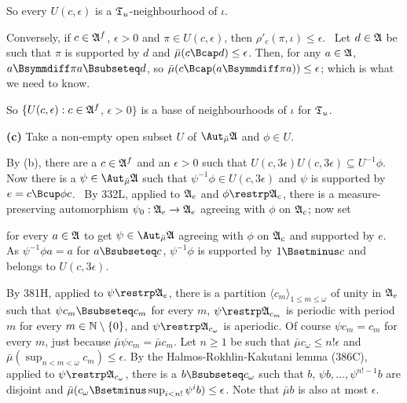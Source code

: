 {So every $U(c,\epsilon)$ is a $\frak T_u$-neighbourhood of $\iota$.

\medskip

 Conversely, if $c\in\frak A^f$, $\epsilon>0$ and
$\pi\in U(c,\epsilon)$, then $\rho'_c(\pi,\iota)\le\epsilon$.   \Prf\
Let $d\in\frak A$ be such that $\pi$ is supported by $d$ and
$\bar\mu(c\Bcap d)\le\epsilon$.   Then, for any $a\in\frak A$,
$a\Bsymmdiff\pi a\Bsubseteq d$, so
$\bar\mu(c\Bcap(a\Bsymmdiff\pi a))\le\epsilon$;  which is what we need to
know.\ \Qed

So $\{U(c,\epsilon):c\in\frak A^f$, $\epsilon>0\}$ is a base of
neighbourhoods of $\iota$ for $\frak T_u$.

\medskip

{\bf (c)} Take a non-empty open subset $U$ of $\AmuA$ and
$\phi\in U$.

\medskip

 By (b), there are a $c\in\frak A^f$ and an $\epsilon>0$
such that $U(c,3\epsilon)U(c,3\epsilon)\subseteq U^{-1}\phi$.   Now there
is a $\psi\in\AmuA$ such that $\psi^{-1}\phi\in U(c,3\epsilon)$
and $\psi$ is supported by $e=c\Bcup\phi c$.
\Prf\ By 332L, applied to $\frak A_e$ and $\phi\restrp\frak A_c$,
there is a measure-preserving automorphism $\psi_0:\frak A_e\to\frak A_e$
agreeing with $\phi$ on $\frak A_c$;  now set


\noindent for every $a\in\frak A$ to get $\psi\in\AmuA$ agreeing with
$\phi$ on $\frak A_c$ and supported by $e$.   As
$\psi^{-1}\phi a=a$ for $a\Bsubseteq c$, $\psi^{-1}\phi$ is supported by
$1\Bsetminus c$ and belongs to $U(c,3\epsilon)$.\ \Qed

\medskip

 By 381H, applied to $\psi\restrp\frak A_e$,
there is a partition
$\langle c_m\rangle_{1\le m\le\omega}$ of unity in $\frak A_e$ such that
$\psi c_m\Bsubseteq c_m$ for every $m$, $\psi\restrp\frak A_{c_m}$ is
periodic with period $m$ for every $m\in\Bbb N\setminus\{0\}$, and
$\psi\restrp\frak A_{c_{\omega}}$ is aperiodic.   Of course $\psi c_m=c_m$
for every $m$, just because $\bar\mu\psi c_m=\bar\mu c_m$.
Let $n\ge 1$ be such that $\bar\mu c_{\omega}\le n!\epsilon$ and
$\bar\mu(\sup_{n<m<\omega}c_m)\le\epsilon$.
By the Halmos-Rokhlin-Kakutani lemma (386C), applied to
$\psi\restrp\frak A_{c_{\omega}}$, there is a $b\Bsubseteq c_{\omega}$
such that $b$, $\psi b,\ldots,\psi^{n!-1}b$ are disjoint and
$\bar\mu(c_{\omega}\Bsetminus\sup_{i<n!}\psi^ib)\le\epsilon$.
Note that $\bar\mu b$ is also at most $\epsilon$.

}
